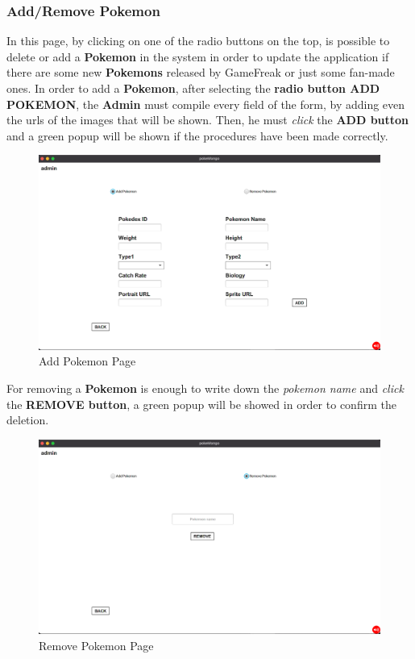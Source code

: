 \subsubsection{Add/Remove Pokemon}
In this page, by clicking on one of the radio buttons on the top, is possible to delete or add a \textbf{Pokemon} in the system in order to update the application if there are some new \textbf{Pokemons} released by GameFreak or just some fan-made ones. 
In order to add a \textbf{Pokemon}, after selecting the \textbf{radio button ADD POKEMON}, the \textbf{Admin} must compile every field of the form, by adding even the urls of the images that will be shown. Then, he must \textit{click} the \textbf{ADD button} and a green popup will be shown if the procedures have been made correctly. 
\begin{figure}[H]
	\centering
	\includegraphics[width=\textwidth]{img/userManual/add_pokemon.png}
	\caption{Add Pokemon Page}
\end{figure}
For removing a \textbf{Pokemon} is enough to write down the \textit{pokemon name} and \textit{click} the \textbf{REMOVE button}, a green popup will be showed in order to confirm the deletion.
\begin{figure}[H]
	\centering
	\includegraphics[width=\textwidth]{img/userManual/remove_pokemon.png}
	\caption{Remove Pokemon Page}
\end{figure}
